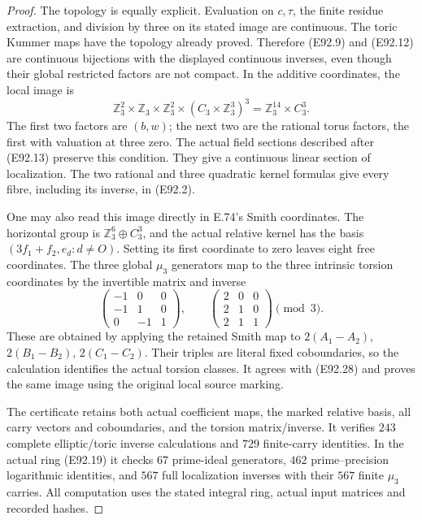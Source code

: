 \begin{proof}
The topology is equally explicit. Evaluation
on $c,\tau$, the finite residue extraction,
and division by three on its stated image
are continuous. The toric Kummer maps have
the topology already proved. Therefore
(E92.9) and (E92.12) are continuous bijections
with the displayed continuous inverses,
even though their global restricted factors
are not compact. In the additive coordinates,
the local image is
\[
 \mathbb Z_3^2\times\mathbb Z_3\times\mathbb Z_3^2
                   \times(C_3\times\mathbb Z_3^3)^3
                =\mathbb Z_3^{14}\times C_3^3.
 \tag{E92.28}
\]
The first two factors are $(b,w)$; the next
two are the rational torus factors, the
first with valuation at three zero.
The actual field sections described after
(E92.13) preserve this condition. They give
a continuous linear section of localization.
The two rational and three quadratic kernel
formulas give every fibre, including its
inverse, in (E92.2).

One may also read this image directly in
E.74's Smith coordinates. The horizontal
group is $\mathbb Z_3^6\oplus C_3^3$, and
the actual relative kernel has the basis
$(3f_1+f_2,e_d:d\ne O)$. Setting its first
coordinate to zero leaves eight free
coordinates. The three global $\mu_3$
generators map to the three intrinsic
torsion coordinates by the invertible
matrix and inverse
\[
 \begin{pmatrix}-1&0&0\\-1&1&0\\0&-1&1\end{pmatrix},
 \qquad
 \begin{pmatrix}2&0&0\\2&1&0\\2&1&1\end{pmatrix}\pmod3.
 \tag{E92.29}
\]
These are obtained by applying the retained
Smith map to $2(A_1-A_2)$, $2(B_1-B_2)$,
$2(C_1-C_2)$. Their triples are literal
fixed coboundaries, so the calculation
identifies the actual torsion classes.
It agrees with (E92.28) and proves the
same image using the original local
source marking.

The certificate retains both actual coefficient
maps, the marked relative basis, all carry
vectors and coboundaries, and the torsion
matrix/inverse. It verifies $243$ complete
elliptic/toric inverse calculations and $729$
finite-carry identities. In the actual ring
(E92.19) it checks $67$ prime-ideal generators,
$462$ prime--precision logarithmic identities,
and $567$ full localization inverses with
their $567$ finite $\mu_3$ carries. All
computation uses the stated integral ring,
actual input matrices and recorded hashes.
\end{proof}

